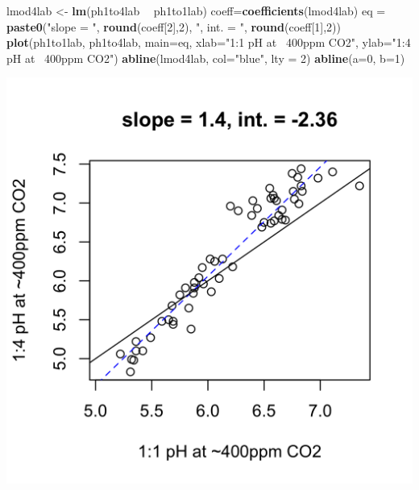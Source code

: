 \documentclass[]{article}
\newenvironment{Shaded}{\begin{snugshade}}{\end{snugshade}}
\newcommand{\DataTypeTok}[1]{\textcolor[rgb]{0.13,0.29,0.53}{#1}}
\newcommand{\DecValTok}[1]{\textcolor[rgb]{0.00,0.00,0.81}{#1}}
\newcommand{\KeywordTok}[1]{\textcolor[rgb]{0.13,0.29,0.53}{\textbf{#1}}}
\newcommand{\NormalTok}[1]{#1}
\newcommand{\OperatorTok}[1]{\textcolor[rgb]{0.81,0.36,0.00}{\textbf{#1}}}
\newcommand{\StringTok}[1]{\textcolor[rgb]{0.31,0.60,0.02}{#1}}
\begin{document}
\begin{Shaded}
\begin{Highlighting}[]
\NormalTok{lmod4lab <-}\StringTok{ }\KeywordTok{lm}\NormalTok{(ph1to4lab }\OperatorTok{~}\StringTok{ }\NormalTok{ph1to1lab)}
\NormalTok{coeff=}\KeywordTok{coefficients}\NormalTok{(lmod4lab)}
\NormalTok{eq =}\StringTok{ }\KeywordTok{paste0}\NormalTok{(}\StringTok{"slope = "}\NormalTok{, }\KeywordTok{round}\NormalTok{(coeff[}\DecValTok{2}\NormalTok{],}\DecValTok{2}\NormalTok{), }\StringTok{", int. = "}\NormalTok{, }\KeywordTok{round}\NormalTok{(coeff[}\DecValTok{1}\NormalTok{],}\DecValTok{2}\NormalTok{))}
\KeywordTok{plot}\NormalTok{(ph1to1lab, ph1to4lab, }\DataTypeTok{main=}\NormalTok{eq,}
   \DataTypeTok{xlab=}\StringTok{"1:1 pH at ~400ppm CO2"}\NormalTok{, }\DataTypeTok{ylab=}\StringTok{"1:4 pH at ~400ppm CO2"}\NormalTok{)}
\KeywordTok{abline}\NormalTok{(lmod4lab, }\DataTypeTok{col=}\StringTok{"blue"}\NormalTok{, }\DataTypeTok{lty =} \DecValTok{2}\NormalTok{)}
\KeywordTok{abline}\NormalTok{(}\DataTypeTok{a=}\DecValTok{0}\NormalTok{, }\DataTypeTok{b=}\DecValTok{1}\NormalTok{)}
\end{Highlighting}
\end{Shaded}

\includegraphics{output-rmd/whitman-figure-request-4-lab-wisc-1.png}
\end{document}
